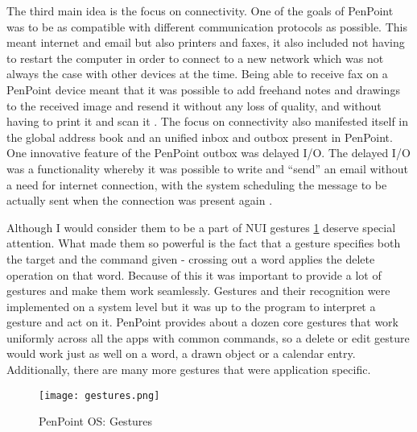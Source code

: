 The third main idea is the focus on connectivity. One of the goals of PenPoint
was to be as compatible with different communication protocols as possible.
This meant internet and email but also printers and faxes, it also included not
having to restart the computer in order to connect to a new network which was
not always the case with other devices at the time. Being able to receive fax
on a PenPoint device meant that it was possible to add freehand notes and
drawings to the received image and resend it without any loss of quality, and
without having to print it and scan it \cite{godemo1991}. The focus on
connectivity also manifested itself in the global address book and an unified
inbox and outbox present in PenPoint. One innovative feature of the PenPoint
outbox was delayed I/O. The delayed I/O was a functionality whereby it was
possible to write and ``send'' an email without a need for internet connection,
with the system scheduling the message to be actually sent when the connection
was present again \cite{carr1991} \cite{brown1993}.

Although I would consider them to be a part of NUI gestures \ref{fig:gestures}
deserve special attention. What made them so powerful is the fact that
a gesture specifies both the target and the command given - crossing out a word
applies the delete operation on that word. Because of this it was important to
provide a lot of gestures and make them work seamlessly. Gestures and their
recognition were implemented on a system level but it was up to the program to
interpret a gesture and act on it. PenPoint provides about a dozen core
gestures that work uniformly across all the apps with common commands, so
a delete or edit gesture would work just as well on a word, a drawn object or
a calendar entry.  Additionally, there are many more gestures that were
application specific.

\begin{figure}[!h]
    \centering \texttt{[image: gestures.png]}
    \caption{PenPoint OS: Gestures}
    \label{fig:gestures}
\end{figure}

